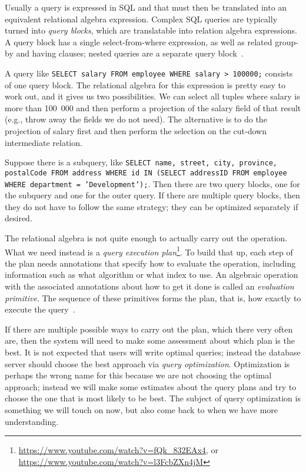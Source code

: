 Usually a query is expressed in SQL and that must then be translated into an equivalent relational algebra expression. Complex SQL queries are typically turned into \textit{query blocks}, which are translatable into relation algebra expressions. A query block has a single select-from-where expression, as well as related group-by and having clauses; nested queries are a separate query block~\cite{fds}.

A query like \texttt{SELECT salary FROM employee WHERE salary > 100000;} consists of one query block. The relational algebra for this expression is pretty easy to work out, and it gives us two possibilities. We can select all tuples where salary is more than 100~000 and then perform a projection of the salary field of that result (e.g., throw away the fields we do not need). The alternative is to do the projection of salary first and then perform the selection on the cut-down intermediate relation.

Suppose there is a subquery, like \texttt{SELECT name, street, city, province, postalCode FROM address WHERE id IN (SELECT addressID FROM employee WHERE department = 'Development');}. Then there are two query blocks, one for the subquery and one for the outer query. If there are multiple query blocks, then they do not have to follow the same strategy; they can be optimized separately if desired. 

The relational algebra is not quite enough to actually carry out the operation. What we need instead is a \textit{query execution plan}\footnote{\url{https://www.youtube.com/watch?v=fQk_832EAx4}, or \url{https://www.youtube.com/watch?v=l3FcbZXn4jM}}. To build that up, each step of the plan needs annotations that specify how to evaluate the operation, including information such as what algorithm or what index to use. An algebraic operation with the associated annotations about how to get it done is called an \textit{evaluation primitive}. The sequence of these primitives forms the plan, that is, how exactly to execute the query~\cite{dsc}. 

If there are multiple possible ways to carry out the plan, which there very often are, then the system will need to make some assessment about which plan is the best. It is not expected that users will write optimal queries; instead the database server should choose the best approach via \textit{query optimization}. Optimization is perhaps the wrong name for this because we are not choosing the optimal approach; instead we will make some estimates about the query plans and try to choose the one that is most likely to be best. The subject of query optimization is something we will touch on now, but also come back to when we have more understanding.

